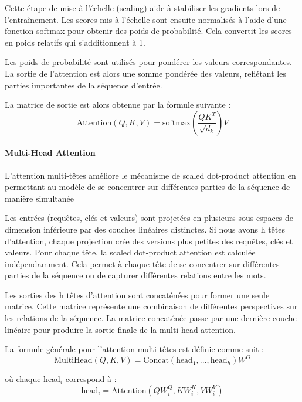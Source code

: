 Cette étape de mise à l'échelle (scaling) aide à stabiliser les gradients lors de l'entraînement. Les scores mis à l'échelle sont ensuite normalisés à l'aide d'une fonction softmax pour obtenir des poids de probabilité. Cela convertit les scores en poids relatifs qui s'additionnent à 1.

Les poids de probabilité sont utilisés pour pondérer les valeurs correspondantes. La sortie de l'attention est alors une somme pondérée des valeurs, reflétant les parties importantes de la séquence d'entrée.

La matrice de sortie est alors obtenue par la formule suivante :
\begin{equation}
    \text{Attention}(Q, K, V) = \text{softmax}\left(\frac{QK^T}{\sqrt{d_k}}\right)V
\end{equation}

\paragraph{Multi-Head Attention} \hspace{0pt}

L'attention multi-têtes améliore le mécanisme de scaled dot-product attention en permettant au modèle de se concentrer sur différentes parties de la séquence de manière simultanée

Les entrées (requêtes, clés et valeurs) sont projetées en plusieurs sous-espaces de dimension inférieure par des couches linéaires distinctes. Si nous avons h têtes d'attention, chaque projection crée des versions plus petites des requêtes, clés et valeurs. Pour chaque tête, la scaled dot-product attention est calculée indépendamment. Cela permet à chaque tête de se concentrer sur différentes parties de la séquence ou de capturer différentes relations entre les mots.

Les sorties des h têtes d'attention sont concaténées pour former une seule matrice. Cette matrice représente une combinaison de différentes perspectives sur les relations de la séquence. La matrice concaténée passe par une dernière couche linéaire pour produire la sortie finale de la multi-head attention.

La formule générale pour l'attention multi-têtes est définie comme suit :
\begin{equation}
    \text{MultiHead}(Q, K, V) = \text{Concat}(\text{head}_1, ..., \text{head}_h)W^O
\end{equation}

où chaque \(\text{head}_i\) correspond à : 
\begin{equation}
    \text{head}_i = \text{Attention}(QW^Q_i, KW^K_i, VW^V_i)
\end{equation}

